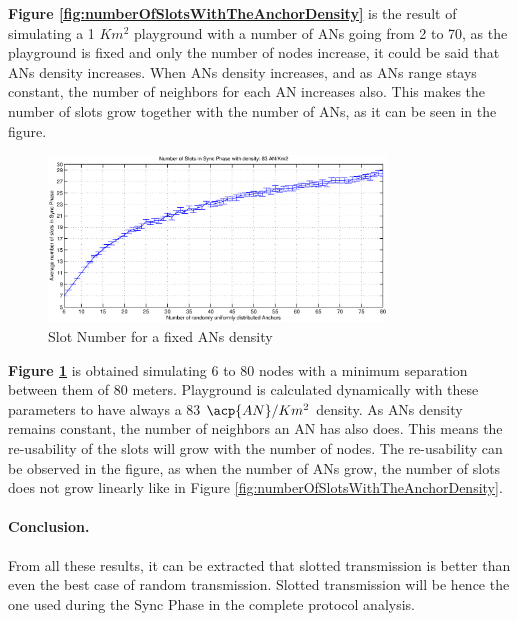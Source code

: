 \textbf{Figure \ref{fig:numberOfSlotsWithTheAnchorDensity}} is the result of simulating a 1 $Km^2$ playground with a number of \acp{AN} going from 
2 to 70, as the playground is fixed and only the number of nodes increase, it could be said that \acp{AN} density increases. When \acp{AN} density 
increases, and as \acp{AN} range stays constant, the number of neighbors for each \ac{AN} increases also. This makes the number of slots grow together
with the number of \acp{AN}, as it can be seen in the figure.

\begin{figure}[ht]
 \begin{center}
  \includegraphics[width=0.8\textwidth]{numberOfSlotsWithTheSameDensity.eps}
 \end{center}
 \caption{Slot Number for a fixed \acp{AN} density}
 \label{fig:numberOfSlotsWithTheSameDensity}
\end{figure}

\textbf{Figure \ref{fig:numberOfSlotsWithTheSameDensity}} is obtained simulating 6 to 80 nodes with a minimum separation between them of 
80 meters. Playground is calculated dynamically with these parameters to have always a 83 $\acp{AN}/Km^2$ density. As \acp{AN} density remains constant,
the number of neighbors an \ac{AN} has also does. This means the re-usability of the slots will grow with the number of nodes. The re-usability can be
observed in the figure, as when the number of \acp{AN} grow, the number of slots does not grow linearly like in Figure 
\ref{fig:numberOfSlotsWithTheAnchorDensity}.

\paragraph{Conclusion.} From all these results, it can be extracted that slotted transmission is better than even the best case of random transmission. 
Slotted transmission will be hence the one used during the Sync Phase in the complete protocol analysis.

